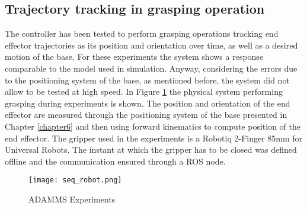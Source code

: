 \subsection{Trajectory tracking in grasping operation}

The controller has been tested to perform grasping operations tracking end effector trajectories as its position and orientation over time, as well as a desired motion of the base. For these experiments the system shows a response comparable to the model used in simulation. Anyway, considering the errors due to the positioning system of the base, as mentioned before, the system did not allow to be tested at high speed. In Figure \ref{seq_robot} the physical system performing grasping during experiments is shown. The position and orientation of the end effector are measured through the positioning system of the base presented in Chapter \ref{chapter6} and then using forward kinematics to compute position of the end effector. The gripper used in the experiments is a Robotiq 2-Finger 85mm for Universal Robots. The instant at which the gripper has to be closed was defined offline and the communication ensured through a ROS node. 
\begin{figure}[h!]
\centering
\texttt{[image: seq\_robot.png]}
\caption{ADAMMS Experiments}
\label{seq_robot}
\end{figure}

